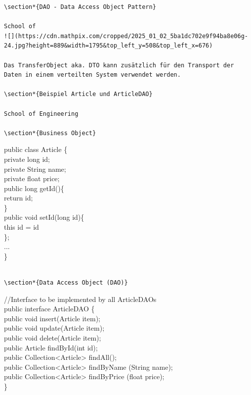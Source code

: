 \documentclass[10pt]{article}
\begin{document}
\begin{verbatim}
\section*{DAO - Data Access Object Pattern}

School of
![](https://cdn.mathpix.com/cropped/2025_01_02_5ba1dc702e9f94ba8e06g-24.jpg?height=889&width=1795&top_left_y=508&top_left_x=676)

Das TransferObject aka. DTO kann zusätzlich für den Transport der Daten in einem verteilten System verwendet werden.

\section*{Beispiel Article und ArticleDAO}

School of Engineering

\section*{Business Object}
\end{verbatim}

public class Article \{\\
private long id;\\
private String name;\\
private float price;\\
public long getId()\{\\
return id;\\
\}\\
public void setId(long id)\{\\
this id = id\\
\};\\
...\\
\}

\begin{verbatim}

\section*{Data Access Object (DAO)}
\end{verbatim}

//Interface to be implemented by all ArticleDAOs\\
public interface ArticleDAO \{\\
public void insert(Article item);\\
public void update(Article item);\\
public void delete(Article item);\\
public Article findById(int id);\\
public Collection<Article> findAll();\\
public Collection<Article> findByName (String name);\\
public Collection<Article> findByPrice (float price);\\
\}
\end{document}
